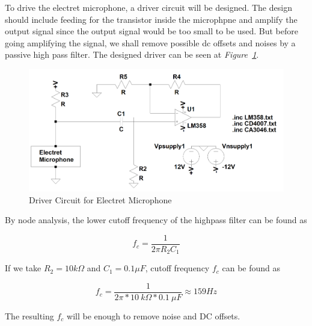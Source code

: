\documentclass[paper]{IEEEtran}
\begin{document}
	To drive the electret microphone, a driver circuit will be designed. The design should include feeding for the transistor inside the microphpne and amplify the output signal since the output signal would be too small to be used. But before going amplifying the signal, we shall remove possible dc offsets and noises by a passive high pass filter. The designed driver can be seen at \textit{Figure~\ref{fig:micdr}}.

\begin{figure}[h!]
\setlength{\unitlength}{\textwidth}
\center 
\includegraphics[width=0.5\unitlength]{electret.png}
\caption{\label{fig:micdr} Driver Circuit for Electret Microphone }
\end{figure}	


By node analysis, the lower cutoff frequency of the highpass filter can be found as

$$ f_{c} =\frac{1}{2\pi R_{2}C_{1}} $$

If we take $R_{2}=10k\Omega$ and $C_{1}=0.1\mu F$, cutoff frequency $f_c$ can be found as

$$ f_{c} =\frac{1}{2\pi*10~k\Omega*0.1~\mu F}\approx 159 Hz $$

The resulting $f_c$ will be enough to remove noise and DC offsets.

\end{document}
